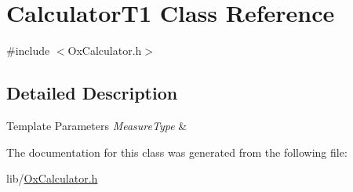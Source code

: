 \hypertarget{class_calculator_t1}{}\section{Calculator\+T1 Class Reference}
\label{class_calculator_t1}


{\ttfamily \#include $<$Ox\+Calculator.\+h$>$}



\subsection{Detailed Description}

\begin{DoxyTemplParams}{Template Parameters}
{\em Measure\+Type} & \\
\hline
\end{DoxyTemplParams}


The documentation for this class was generated from the following file\+:\begin{DoxyCompactItemize}
\item 
lib/\hyperlink{_ox_calculator_8h}{Ox\+Calculator.\+h}\end{DoxyCompactItemize}
